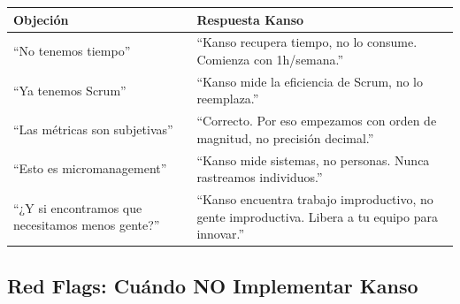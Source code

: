 \begin{table}[h]
\centering
\begin{tabular}{|p{4cm}|p{9cm}|}
\hline
\textbf{Objeción} & \textbf{Respuesta Kanso} \\
\hline
``No tenemos tiempo'' & ``Kanso recupera tiempo, no lo consume. Comienza con 1h/semana.'' \\
\hline
``Ya tenemos Scrum'' & ``Kanso mide la eficiencia de Scrum, no lo reemplaza.'' \\
\hline
``Las métricas son subjetivas'' & ``Correcto. Por eso empezamos con orden de magnitud, no precisión decimal.'' \\
\hline
``Esto es micromanagement'' & ``Kanso mide sistemas, no personas. Nunca rastreamos individuos.'' \\
\hline
``¿Y si encontramos que necesitamos menos gente?'' & ``Kanso encuentra trabajo improductivo, no gente improductiva. Libera a tu equipo para innovar.'' \\
\hline
\end{tabular}
\end{table}

\subsection*{Red Flags: Cuándo NO Implementar Kanso}

